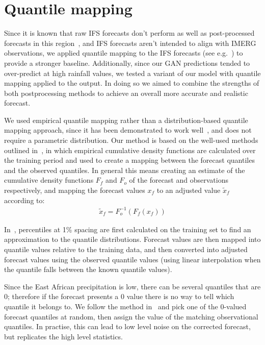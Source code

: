 \documentclass{article}
\begin{document}
\section{Quantile mapping}
\label{subsec:qm}
Since it is known that raw IFS forecasts don't perform as well as post-processed forecasts in this region~\citep{vogel_skill_2018}, and IFS forecasts aren't intended to align with IMERG observations, we applied quantile mapping to the IFS forecasts (see e.g.~\cite{maraun_model_2017}) to provide a stronger baseline. Additionally, since our GAN predictions tended to over-predict at high rainfall values, we tested a variant of our model with quantile mapping applied to the output. In doing so we aimed to combine the strengths of both postprocessing methods to achieve an overall more accurate and realistic forecast. 


We used empirical quantile mapping rather than a distribution-based quantile mapping approach, since it has been demonstrated to work well~\citep{gudmundsson_quantile_2012}, and does not require a parametric distribution. Our method is based on the well-used methods outlined in~\cite{boe_statistical_2007, deque_frequency_2007, maraun_model_2017}, in which empirical cumulative density functions are calculated over the training period and used to create a mapping between the forecast quantiles and the observed quantiles. In general this means creating an estimate of the cumulative density functions $F_{f}$ and $F_{o}$ of the forecast and observations respectively, and mapping the forecast values $x_{f}$ to an adjusted value $\tilde{x}_f$ according to:
\begin{align}
    \tilde{x}_f = F^{-1}_o (F_f (x_f))
\end{align}

In~\cite{boe_statistical_2007}, percentiles at 1\% spacing are first calculated on the training set to find an approximation to the quantile distributions. Forecast values are then mapped into quantile values relative to the training data, and then converted into adjusted forecast values using the observed quantile values (using linear interpolation when the quantile falls between the known quantile values). 

Since the East African precipitation is low, there can be several quantiles that are 0; therefore if the forecast presents a 0 value there is no way to tell which quantile it belongs to. We follow the method in~\cite{boe_statistical_2007} and pick one of the 0-valued forecast quantiles at random, then assign the value of the matching observational quantiles. In practise, this can lead to low level noise on the corrected forecast, but replicates the high level statistics.
\end{document}
